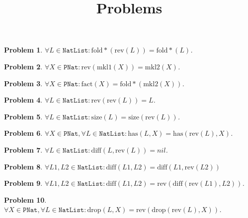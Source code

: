 \documentclass[12pt, a4paper]{article}
\title{Problems}
\date{\vspace{-5ex}}
\newtheorem{problem}{Problem}
\newcommand{\rmx}[1]{\mathrm{#1}}
\begin{document}
\maketitle

\begin{problem}
$\forall L \in \mathtt{NatList} \colon \rmx{fold*}(\rmx{rev}(L)) = \rmx{fold*}(L)$.
\end{problem}

\begin{problem}
$\forall X \in \mathtt{PNat} \colon \rmx{rev}(\rmx{mkl1}(X)) = \rmx{mkl2}(X)$.
\end{problem}

\begin{problem}
$\forall X \in \mathtt{PNat} \colon \rmx{fact}(X) = \rmx{fold*}(\rmx{mkl2}(X))$.
\end{problem}

\begin{problem}
$\forall L \in \mathtt{NatList} \colon \rmx{rev}(\rmx{rev}(L)) = L$.
\end{problem}

\begin{problem}
$\forall L \in \mathtt{NatList} \colon \rmx{size}(L) = \rmx{size}(\rmx{rev}(L))$.
\end{problem}

\begin{problem}
$\forall X \in \mathtt{PNat}, \forall L \in \mathtt{NatList} \colon \rmx{has}(L, X) = \rmx{has}(\rmx{rev}(L), X)$.
\end{problem}

\begin{problem}
$\forall L \in \mathtt{NatList} \colon \rmx{diff}(L, \rmx{rev}(L)) = nil$.
\end{problem}

\begin{problem}
$\forall L1, L2 \in \mathtt{NatList} \colon \rmx{diff}(L1, L2) = \rmx{diff}(L1, \rmx{rev}(L2))$
\end{problem}

\begin{problem}
$\forall L1, L2 \in \mathtt{NatList} \colon \rmx{diff}(L1, L2) = \rmx{rev}(\rmx{diff}(\rmx{rev}(L1), L2))$.
\end{problem}

\begin{problem}
$\forall X \in \mathtt{PNat}, \forall L \in \mathtt{NatList} \colon \rmx{drop}(L, X) = \rmx{rev}(\rmx{drop}(\rmx{rev}(L), X))$.
\end{problem}
\end{document}
